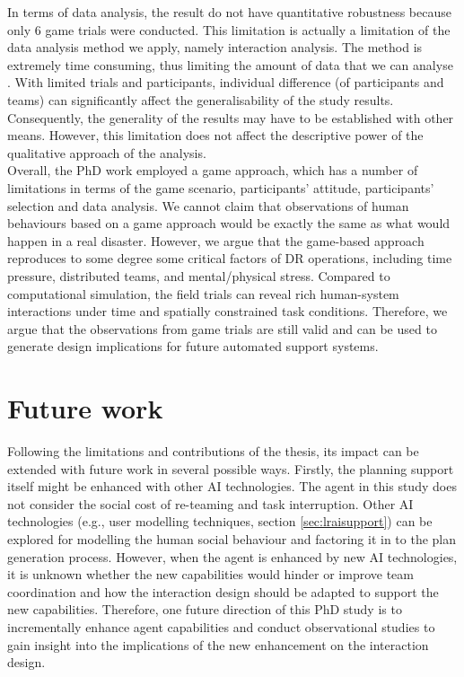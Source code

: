 In terms of data analysis, the result do not have quantitative robustness because only 6 game trials were conducted. This limitation is actually a limitation of the data analysis method we apply, namely interaction analysis. The method is extremely time consuming, thus limiting the amount of data that we can analyse \citep{Crabtree2012}. With limited trials and participants, individual difference (of participants and teams) can significantly affect the generalisability of the study results. Consequently, the generality of the results may have to be established with other means. However, this limitation does not affect the descriptive power of the qualitative approach of the analysis. \\

Overall, the PhD work employed a game approach, which has a number of limitations in terms of the game scenario, participants' attitude, participants' selection and data analysis. We cannot claim that observations of human behaviours based on a game approach would be exactly the same as what would happen in a real disaster. However, we argue that the game-based approach reproduces to some degree some critical factors of \ac{DR} operations, including time pressure, distributed teams, and mental/physical stress. Compared to computational simulation, the field trials can reveal rich human-system interactions under time and spatially constrained task conditions. Therefore, we argue that the observations from game trials are still valid and can be used to generate design implications for future automated support systems. \\


\section{Future work}
Following the limitations and contributions of the thesis, its impact can be extended with future work in several possible ways. Firstly, the planning support itself might be enhanced with other AI technologies. The agent in this study does not consider the social cost of re-teaming and task interruption. Other AI technologies (e.g.,  user modelling techniques, section \ref{sec:lraisupport}) can be explored for modelling the human social behaviour and factoring it in to the plan generation process.  However, when the agent is enhanced by new AI technologies, it is unknown whether the new capabilities would hinder or improve team coordination and how the interaction design should be adapted to support the new capabilities. Therefore, one future direction of this PhD study is to incrementally enhance agent capabilities and conduct observational studies to gain insight into the implications of the new enhancement on the interaction design.\\


